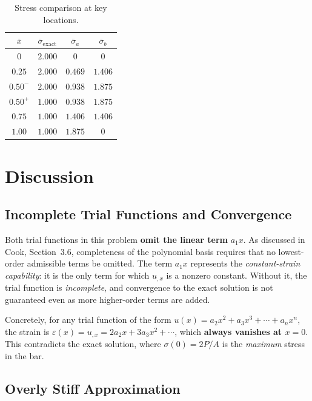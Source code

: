 \documentclass[11pt, a4paper]{article}
\begin{document}
\begin{table}[H]
\centering
\renewcommand{\arraystretch}{1.4}
\begin{tabular}{@{}c c c c@{}}
\toprule
$\bar{x}$ & $\bar{\sigma}_{\text{exact}}$ & $\bar{\sigma}_a$ & $\bar{\sigma}_b$ \\
\midrule
$0$    & $2.000$ & $0$     & $0$     \\
$0.25$ & $2.000$ & $0.469$ & $1.406$ \\
$0.50^{-}$ & $2.000$ & $0.938$ & $1.875$ \\
$0.50^{+}$ & $1.000$ & $0.938$ & $1.875$ \\
$0.75$ & $1.000$ & $1.406$ & $1.406$ \\
$1.00$ & $1.000$ & $1.875$ & $0$     \\
\bottomrule
\end{tabular}
\caption{Stress comparison at key locations.}
\label{tab:stress}
\end{table}

\section{Discussion}\label{sec:discussion}

\subsection{Incomplete Trial Functions and Convergence}

Both trial functions in this problem \textbf{omit the linear term} $a_1 x$.  As discussed in Cook, Section~3.6, completeness of the polynomial basis requires that no lowest-order admissible terms be omitted.  The term $a_1 x$ represents the \textit{constant-strain capability}: it is the only term for which $u_{,x}$ is a nonzero constant.  Without it, the trial function is \textit{incomplete}, and convergence to the exact solution is not guaranteed even as more higher-order terms are added.

Concretely, for any trial function of the form $u(x) = a_2 x^2 + a_3 x^3 + \cdots + a_n x^n$, the strain is $\varepsilon(x) = u_{,x} = 2a_2 x + 3a_3 x^2 + \cdots$, which \textbf{always vanishes at $x=0$}.  This contradicts the exact solution, where $\sigma(0) = 2P/A$ is the \textit{maximum} stress in the bar.

\subsection{Overly Stiff Approximation}
\end{document}
